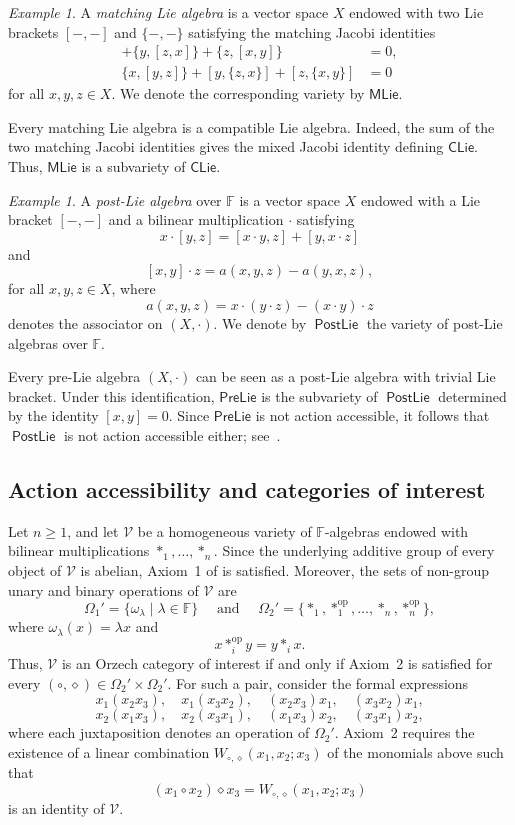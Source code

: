 \documentclass[reqno,a4paper]{amsart}
\theoremstyle{plain}
\theoremstyle{definition}
\theoremstyle{remark}
\newtheorem{example}[subsection]{Example}
\numberwithin{equation}{section}
\newcommand{\F}{\mathbb{F}}
\newcommand{\V}{\mathcal{V}}
\DeclareMathOperator{\op}{op}
\newcommand{\PreLie}{\ensuremath{\mathsf{PreLie}}}
\newcommand{\CLie}{\ensuremath{\mathsf{CLie}}}
\newcommand{\MatchLie}{\ensuremath{\mathsf{MLie}}}
\newcommand{\PostLie}{\operatorname{\mathsf{PostLie}}}
\begin{document}
\begin{example}\cite{GaoGuoZhang}\label{ExampleMatchingLie}
A \emph{matching Lie algebra} is a vector space $X$ endowed with two Lie brackets $[-,-]$ and $\{-,-\}$ satisfying the matching Jacobi identities
\begin{align*}
[x,\{y,z\}]+\{y,[z,x]\}+\{z,[x,y]\}&=0,\\
\{x,[y,z]\}+[y,\{z,x\}]+[z,\{x,y\}]&=0
\end{align*}
for all $x,y,z\in X$. We denote the corresponding variety by $\MatchLie$.

Every matching Lie algebra is a compatible Lie algebra. Indeed, the sum of the two matching Jacobi identities gives the mixed Jacobi identity defining $\CLie$. Thus, $\MatchLie$ is a subvariety of $\CLie$.
\end{example}

\begin{example}\cite{VallettePostLie}
A \emph{post-Lie algebra} over $\F$ is a vector space $X$ endowed with a Lie bracket $[-,-]$ and a bilinear multiplication $\cdot$ satisfying
\[
x\cdot[y,z]=[x\cdot y,z]+[y,x\cdot z]
\]
and
\[
[x,y]\cdot z=a(x,y,z)-a(y,x,z),
\]
for all $x,y,z\in X$, where
\[
a(x,y,z)=x\cdot(y\cdot z)-(x\cdot y)\cdot z
\]
denotes the associator on $(X,\cdot)$. We denote by $\PostLie$ the variety of post-Lie algebras over $\F$. 

Every pre-Lie algebra $(X,\cdot)$ can be seen as a post-Lie algebra with trivial Lie bracket. Under this identification, $\PreLie$ is the subvariety of $\PostLie$ determined by the identity $[x,y]=0$. Since $\PreLie$ is not action accessible, it follows that $\PostLie$ is not action accessible either; see~\cite[Proposition~3.5]{AlbanoStefanelli}.
\end{example}

\subsection{Action accessibility and categories of interest}\label{SecNCategoriesInterest}

Let $n\geq1$, and let $\V$ be a homogeneous variety of $\F$-algebras endowed with bilinear multiplications $\ast_1,\ldots,\ast_n$. Since the underlying additive group of every object of $\V$ is abelian, Axiom~1 of  is satisfied. Moreover, the sets of non-group unary and binary operations of $\V$ are
\[
\Omega_1'=\{\omega_\lambda\mid\lambda\in\F\} \quad \text{ and } \quad
\Omega_2'=\{\ast_1,\ast_1^{\op},\ldots,\ast_n,\ast_n^{\op}\},
\]
where $\omega_\lambda(x)=\lambda x$ and
\[
x\ast_i^{\op}y=y\ast_i x.
\]
Thus, $\V$ is an Orzech category of interest if and only if Axiom~2 is satisfied for every $(\circ,\diamond)\in\Omega_2'\times\Omega_2'$. For such a pair, consider the formal expressions
\[
x_1(x_2x_3),\quad x_1(x_3x_2),\quad (x_2x_3)x_1,\quad (x_3x_2)x_1,
\]
\[
x_2(x_1x_3),\quad x_2(x_3x_1),\quad (x_1x_3)x_2,\quad (x_3x_1)x_2,
\]
where each juxtaposition denotes an operation of $\Omega_2'$. Axiom~2 requires the existence of a linear combination $W_{\circ,\diamond}(x_1,x_2;x_3)$ of the monomials above such that
\[
(x_1\circ x_2)\diamond x_3
=
W_{\circ,\diamond}(x_1,x_2;x_3)
\]
is an identity of $\V$.
\end{document}
